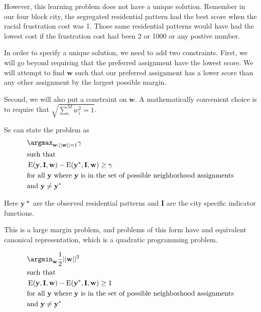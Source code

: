 However, this learning problem does not have a unique
solution. Remember in our four block city, the segregated residential
pattern had the best score when the racial frustration cost was
1. Those same residential patterns would have had the lowest cost if
the frustration cost had been 2 or 1000 or any postive number.

In order to specify a unique solution, we need to add two
constraints. First, we will go beyond requiring that the preferred
assignment have the lowest score. We will attempt to find $\mathbf{w}$
such that our preferred assignment has a lower score than any other
assignment by the largest possible margin. 

Second, we will also put a constraint on $\mathbf{w}$. A
mathematically convenient choice is to require that $\sqrt{\sum_i^M w_i^2 = 1}$.

Se can state the problem as 
%
\begin{align*}
&\argmax_{\mathbf{w}:||\mathbf{w}||=1} \mathbf{\gamma} \\
&\text{such that} \\
&\operatorname{E}(\mathbf{y}, \mathbf{I}, \mathbf{w})
- \operatorname{E}(\mathbf{y}^*, \mathbf{I}, \mathbf{w}) \geq \gamma\\ 
&\text{for all } \mathbf{y} \text{ where } \mathbf{y} \text{ is in the set of
  possible neighborhood assignments}\\
&\text{and } \mathbf{y} \neq \mathbf{y}^*
\end{align*}
%

Here $\mathbf{y}*$ are the observed residential patterns and $\mathbf{I}$
are the city specific indicator functions.

This is a large margin problem, and problems of this form have and
equivalent canonical representation, which is a quadratic programming
problem.

%
\begin{align*}
&\argmin_{\mathbf{w}} \frac{1}{2}||\mathbf{w}||^2 \\
&\text{such that} \\
&\operatorname{E}(\mathbf{y}, \mathbf{I}, \mathbf{w})
- \operatorname{E}(\mathbf{y}^*, \mathbf{I}, \mathbf{w}) \geq 1 \\ 
&\text{for all } \mathbf{y} \text{ where } \mathbf{y} \text{ is in the set of
  possible neighborhood assignments}\\
&\text{and } \mathbf{y} \neq \mathbf{y}^*
\end{align*}


